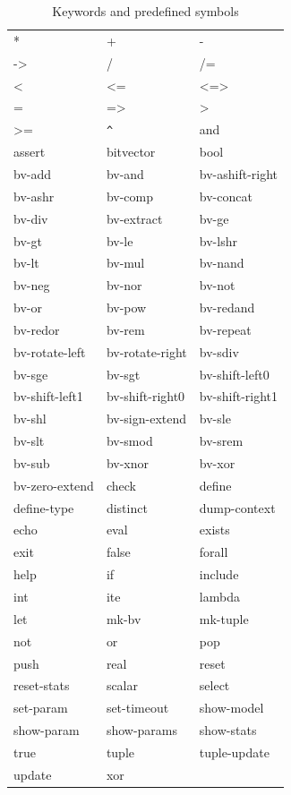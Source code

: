 \documentclass[11pt,twoside,fleqn,openright,titlepage]{cslreport}
\begin{document}
\begin{table}
\begin{small}
\begin{center}
\begin{tt}
\begin{tabular}{|p{3.2cm}|p{3.2cm}|p{3.2cm}|}
\hline
* & + & - \\
-> & / & /= \\
< & <= & <=> \\
 = & => & > \\
>= & \verb|^| & and \\
assert & bitvector & bool \\
bv-add & bv-and & bv-ashift-right\\
bv-ashr & bv-comp & bv-concat \\
bv-div & bv-extract & bv-ge \\
bv-gt & bv-le & bv-lshr \\
bv-lt & bv-mul & bv-nand \\
bv-neg & bv-nor & bv-not \\
bv-or & bv-pow & bv-redand \\
bv-redor & bv-rem & bv-repeat \\
bv-rotate-left & bv-rotate-right & bv-sdiv\\
bv-sge & bv-sgt & bv-shift-left0 \\
bv-shift-left1 & bv-shift-right0 & bv-shift-right1 \\
bv-shl & bv-sign-extend & bv-sle\\
 bv-slt & bv-smod & bv-srem \\
bv-sub & bv-xnor & bv-xor \\
bv-zero-extend & check & define \\
define-type & distinct & dump-context\\
echo  & eval & exists \\
exit & false & forall \\
help & if & include \\
int & ite & lambda \\
let & mk-bv & mk-tuple \\
 not & or & pop \\
push & real & reset \\
reset-stats & scalar & select \\
set-param & set-timeout & show-model \\
show-param & show-params & show-stats \\
true & tuple & tuple-update \\
update & xor &   \\
\hline
\end{tabular}
\end{tt}
\end{center}
\end{small}
\caption{Keywords and predefined symbols}
\label{syntax:keywords}
\end{table}
\end{document}
